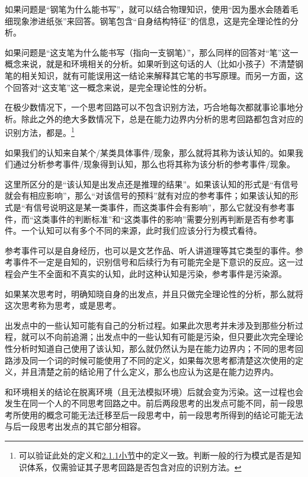 \begin{examples}
如果问题是“钢笔为什么能书写”，就可以结合物理知识，使用“因为墨水会随着毛细现象渗进纸张”来回答。钢笔包含“自身结构特征”的信息，这是完全理论性的分析。

如果问题是“这支笔为什么能书写（指向一支钢笔）”，那么同样的回答对“笔”这一概念来说，就是和环境相关的分析。如果听到这句话的人（比如小孩子）不清楚钢笔的相关知识，就有可能误用这一结论来解释其它笔的书写原理。而另一方面，这个回答对“这支笔”这一概念来说，是完全理论性的分析。

在极少数情况下，一个思考回路可以不包含识别方法，巧合地每次都就事论事地分析。除此之外的绝大多数情况下，总是在能力边界内分析的思考回路都包含对应的识别方法，都是。\footnote{\rigorous 可以验证此处的定义和\hyperref[para:知识体系]{2.1.1小节}中的定义一致。判断一般的行为模式是否是知识体系，仅需验证其子思考回路是否包含对应的识别方法。}
\end{examples}
如果我们的认知来自某个/某类具体事件/现象，那么就将其称为该认知的。如果我们通过分析参考事件/现象得到认知，那么也将其称为该分析的参考事件/现象。
\begin{explain}
这里所区分的是“该认知是出发点还是推理的结果”。如果该认知的形式是“有信号就会有相应影响”，那么“对该信号的预料”就有对应的参考事件；如果该认知的形式是“有信号说明这是某一类事件，而这类事件会有影响”，那么它就没有参考事件，而“这类事件的判断标准”和“这类事件的影响”需要分别再判断是否有参考事件。一个认知可以有多个不同的来源，此时我们应该分行为模式看待。

参考事件可以是自身经历，也可以是文艺作品、听人讲道理等其它类型的事件。参考事件不一定是自知的，识别信号和后续行为有可能完全是下意识的反应。这一过程会产生不全面和不真实的认知，此时这种认知是污染，参考事件是污染源。
\end{explain}
如果某次思考时，明确知晓自身的出发点，并且只做完全理论性的分析，那么就将这次思考称为思考，或是思考。
\begin{explain}
出发点中的一些认知可能有自己的分析过程。如果此次思考并未涉及到那些分析过程，就可以不向前追溯；出发点中的一些认知有可能是污染，但只要此次完全理论性分析时知道自己使用了该认知，那么就仍然认为是在能力边界内；不同的思考回路涉及同一个词的时候可能使用了不同的定义，如果每次思考都清楚这次使用的定义，并且清楚之前的结论用了什么定义，那么也应认为这是在能力边界内。

和环境相关的结论在脱离环境（且无法模拟环境）后就会变为污染。这一过程也会发生在同一个人的不同思考回路之中。前后两段思考的出发点可能不同，前一段思考所使用的概念可能无法迁移至后一段思考中，前一段思考所得到的结论可能无法与后一段思考出发点的其它部分相容。
\end{explain}
